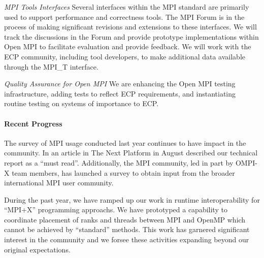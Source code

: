 \emph{MPI Tools Interfaces}  Several interfaces within the
MPI standard are primarily used to support performance and
correctness tools.
The MPI Forum is in the process
of making significant revisions and extensions to these interfaces.
We will track the discussions in the Forum and provide prototype
implementations within Open MPI to facilitate evaluation and provide
feedback.
We will work with the
ECP community, including tool developers, to make additional data
available through the MPI\_T interface.

\emph{Quality Assurance for Open MPI}  We are enhancing the
Open MPI testing infrastructure, adding tests to reflect ECP
requirements, and instantiating routine testing on systems of
importance to ECP.

\paragraph{Recent Progress}
The survey of MPI usage conducted last year continues to have impact
in the community.  In an article in The Next Platform in August
described our technical report \cite{Bernholdt:2018:SMU-tr} as a
``must read''.  Additionally, the MPI community, led in part by OMPI-X
team members, has launched a survey to obtain input from the broader
international MPI user community.

During the past year, we have ramped up our work in runtime
interoperability for ``MPI+X'' programming approachs.  We have
prototyped a capability to coordinate placement of ranks and threads
between MPI and OpenMP which cannot be achieved by ``standard''
methods.  This work has garnered significant interest in the community
and we forsee these activities expanding beyond our original
expectations.


